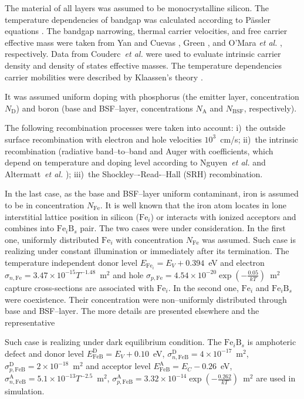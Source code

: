 The material of all layers was assumed to be monocrystalline silicon.
The temperature dependencies of bandgap was calculated according to P\"assler equations \cite{Pasler}.
The bandgap narrowing, thermal carrier velocities,
and  free carrier effective mass
were taken from Yan and Cuevas \cite{EgNarrow}, Green \cite{Nc:Green}, and O'Mara \emph{et al.} \cite{OMara}, respectively.
Data from Couderc~\emph{et al.} \cite{Si_ni_Couderc} were used to evaluate intrinsic carrier density and density of states effective masses.
The temperature dependencies carrier mobilities were described by Klaassen's theory \cite{KLAASSEN953,Hull}.

It was assumed uniform doping with phosphorus (the emitter layer, concentration $N_\mathrm{D}$)
and boron (base and BSF--layer, concentrations $N_\mathrm{A}$ and $N_\mathrm{BSF}$, respectively).

The following recombination processes were taken into account:
i)~the outside surface recombination with electron and hole velocities $10^3$~cm/s;
ii)~the intrinsic recombination (radiative band--to--band and Auger with coefficients,
which depend on temperature and doping level according
to Nguyen~\emph{et al.} \cite{Si_BtB} and Altermatt~\emph{et al.} \cite{Si_Auger});
iii)~the Shockley–-Read-–Hall (SRH) recombination.

In the last case, as the base and BSF--layer uniform contaminant, iron is assumed to be in concentration $N_\mathrm{Fe}$.
It is well known that the iron atom locates in lone interstitial lattice position in silicon ($\mathrm{Fe}_i$) or
interacts with ionized acceptors and combines into $\mathrm{Fe}_i\mathrm{B}_s$ pair.
The two cases were under consideration.
In the first one, uniformly distributed $\mathrm{Fe}_i$ with concentration $N_\mathrm{Fe}$ was assumed.
Such case is realizing under constant illumination or immediately after its termination.
The temperature independent donor level $E_{\mathrm{Fe}_i} = E_V+0.394$~eV \cite{Rein2,MurphyJAP2011,Kohno}
and electron $\sigma_{n,{\mathrm{Fe}}}=3.47\times10^{-15}T^{-1.48}$~m$^2$ and
hole $\sigma_{p,{\mathrm{Fe}}}=4.54\times10^{-20}\exp\left(-\frac{0.05}{kT}\right)$~m$^2$ capture cross-sections \cite{ROUGIEUX2018,Paudyal}
are associated with $\mathrm{Fe}_i$.
In the second one, $\mathrm{Fe}_i$ and $\mathrm{Fe}_i\mathrm{B}_s$ were coexistence.
Their concentration were non--uniformly distributed through base and BSF--layer.
The more details are presented elsewhere \cite{Olikh2019SM} and the representative

Such case is realizing under dark equilibrium condition.
The $\mathrm{Fe}_i\mathrm{B}_s$ is amphoteric defect and donor level $E_{\mathrm{FeB}}^\mathrm{D}= E_V+0.10$~eV,
$\sigma_{n,{\mathrm{FeB}}}^\mathrm{D}=4\times10^{-17}$~m$^2$,
$\sigma_{p,{\mathrm{FeB}}}^\mathrm{D}=2\times10^{-18}$~m$^2$
and acceptor level $E_{\mathrm{FeB}}^\mathrm{A}= E_C-0.26$~eV,
$\sigma_{n,{\mathrm{FeB}}}^\mathrm{A}=5.1\times10^{-13}T^{-2.5}$~m$^2$,
$\sigma_{p,{\mathrm{FeB}}}^\mathrm{A}=3.32\times10^{-14}\exp\left(-\frac{0.262}{kT}\right)$~m$^2$
\cite{Istratov1999,Rein2,MurphyJAP2011,ROUGIEUX2018,Paudyal,FeB:kinetic}
are used in simulation.

